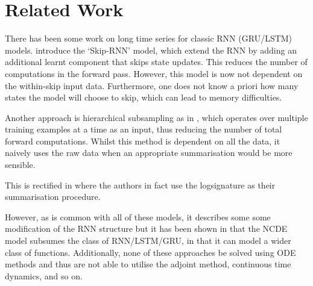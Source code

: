 \section{Related Work}
There has been some work on long time series for classic RNN (GRU/LSTM) models. \citet{campos2017skip} introduce the `Skip-RNN' model, which extend the RNN by adding an additional learnt component that skips state updates. This reduces the number of computations in the forward pass. However, this model is now not dependent on the within-skip input data. Furthermore, one does not know a priori how many states the model will choose to skip, which can lead to memory difficulties. 

Another approach is hierarchical subsampling as in \citet{graves2012supervised, de2015survey}, which operates over multiple training examples at a time as an input, thus reducing the number of total forward computations. Whilst this method is dependent on all the data, it naively uses the raw data when an appropriate summarisation would be more sensible.

This is rectified in \cite{liao2019learning} where the authors in fact use the logsignature as their summarisation procedure.


However, as is common with all of these models, it describes some some modification of the RNN structure but it has been shown in \cite{kidger2020neural} that the NCDE model subsumes the class of RNN/LSTM/GRU, in that it can model a wider class of functions. Additionally, none of these approaches be solved using ODE methods and thus are not able to utilise the adjoint method, continuous time dynamics, and so on.   
